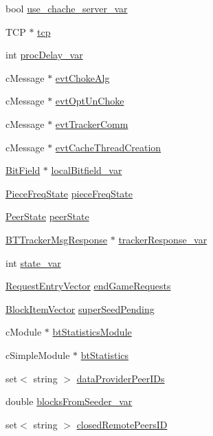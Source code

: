 \begin{DoxyCompactItemize}
bool \hyperlink{classBTPeerWireBase_a5dffbc63fa4a4c544a77cbfb4a46908c}{use\+\_\+chache\+\_\+server\+\_\+var}
\item 
T\+C\+P $\ast$ \hyperlink{classBTPeerWireBase_aff8cb31aa43842c0fab059e388e221ef}{tcp}
\item 
int \hyperlink{classBTPeerWireBase_a7ae53ebd43795e141d27ebdbb3588219}{proc\+Delay\+\_\+var}
\item 
c\+Message $\ast$ \hyperlink{classBTPeerWireBase_ad44a6450f42876e94ca1372e51edcd42}{evt\+Choke\+Alg}
\item 
c\+Message $\ast$ \hyperlink{classBTPeerWireBase_a94d72b62108190bbf2183b6b371b8e4c}{evt\+Opt\+Un\+Choke}
\item 
c\+Message $\ast$ \hyperlink{classBTPeerWireBase_ad75a6b3df2cc0f51e44aa3acb837c936}{evt\+Tracker\+Comm}
\item 
c\+Message $\ast$ \hyperlink{classBTPeerWireBase_a19574db56758ba0a45cd9c0017bef38b}{evt\+Cache\+Thread\+Creation}
\item 
\hyperlink{classBitField}{Bit\+Field} $\ast$ \hyperlink{classBTPeerWireBase_a723a90b749291f3f862fa39ce2df1034}{local\+Bitfield\+\_\+var}
\item 
\hyperlink{classPieceFreqState}{Piece\+Freq\+State} \hyperlink{classBTPeerWireBase_a179b178d1173d13aa608714414058589}{piece\+Freq\+State}
\item 
\hyperlink{classPeerState}{Peer\+State} \hyperlink{classBTPeerWireBase_a5d67dee532c53e838961c5cd37e12430}{peer\+State}
\item 
\hyperlink{classBTTrackerMsgResponse}{B\+T\+Tracker\+Msg\+Response} $\ast$ \hyperlink{classBTPeerWireBase_a4dd433fcd65380323cb62e4b74b73b96}{tracker\+Response\+\_\+var}
\item 
int \hyperlink{classBTPeerWireBase_aaef46a7d9537a431b80d5fed52ec841e}{state\+\_\+var}
\item 
\hyperlink{BTUtils_8h_a23f79ef107bda748bd273978e5eea31a}{Request\+Entry\+Vector} \hyperlink{classBTPeerWireBase_a057a81a91aecb54a9bb1f20ba371f399}{end\+Game\+Requests}
\item 
\hyperlink{BitField_8h_ad6742c937d1179f80218e1cd18cbf8b5}{Block\+Item\+Vector} \hyperlink{classBTPeerWireBase_ae87ae67a5ad8978dde57998c632aff09}{super\+Seed\+Pending}
\item 
c\+Module $\ast$ \hyperlink{classBTPeerWireBase_abc5d6735698c92b5926620f2968c3e0e}{bt\+Statistics\+Module}
\item 
c\+Simple\+Module $\ast$ \hyperlink{classBTPeerWireBase_a90c1bb128400f8a1fdd9990709a48df8}{bt\+Statistics}
\item 
set$<$ string $>$ \hyperlink{classBTPeerWireBase_a319c7c648087f56c1656b7d04a13a016}{data\+Provider\+Peer\+I\+Ds}
\item 
double \hyperlink{classBTPeerWireBase_a4b39809a3fd1b882e1399340b607eb4e}{blocks\+From\+Seeder\+\_\+var}
\item 
set$<$ string $>$ \hyperlink{classBTPeerWireBase_ae3c59b22b14bbd3aeeb29f1b377bdeb6}{closed\+Remote\+Peers\+I\+D}
\end{DoxyCompactItemize}


